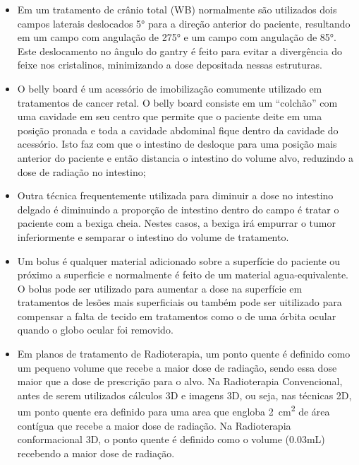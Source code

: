\documentclass[11pt,a4paper]{article}
\newcounter{exemplo}
\begin{document}
\begin{exemplo}
    \begin{itemize}
        \item Em um tratamento de crânio total (WB) normalmente são utilizados dois campos laterais deslocados \ang{5} para a direção anterior do paciente, resultando em um campo com angulação de \ang{275} e um campo com angulação de \ang{85}. Este deslocamento no ângulo do gantry é feito para evitar a divergência do feixe nos cristalinos, minimizando a dose depositada nessas estruturas. 
        
        \item O belly board é um acessório de imobilização comumente utilizado em tratamentos de cancer retal. O belly board consiste em um ``colchão'' com uma cavidade em seu centro que permite que o paciente deite em uma posição pronada e toda a cavidade abdominal fique dentro da cavidade do acessório. Isto faz com que o intestino de desloque para uma posição mais anterior do paciente e então distancia o intestino do volume alvo, reduzindo a dose de radiação no intestino; 
        
        \item Outra técnica frequentemente utilizada para diminuir a dose no intestino delgado é diminuindo a proporção de intestino dentro do campo é tratar o paciente com a bexiga cheia. Nestes casos, a bexiga irá empurrar o tumor inferiormente e semparar o intestino do volume de tratamento.
        
        \item Um bolus é qualquer material adicionado sobre a superfície do paciente ou próximo a superficie e normalmente é feito de um material agua-equivalente. O bolus pode ser utilizado para aumentar a dose na superfície em tratamentos de lesões mais superficiais ou também pode ser uitilizado para compensar a falta de tecido em tratamentos como o de uma órbita ocular quando o globo ocular foi removido.
        
        \item Em planos de tratamento de Radioterapia, um ponto quente é definido como um pequeno volume que recebe a maior dose de radiação, sendo essa dose maior que a dose de prescrição para o alvo. Na Radioterapia Convencional, antes de serem utilizados cálculos 3D e imagens 3D, ou seja, nas técnicas 2D, um ponto quente era definido para uma area que engloba \qty{2}{cm^2} de área contígua que recebe a maior dose de radiação. Na Radioterapia conformacional 3D, o ponto quente é definido como o volume (0.03mL) recebendo a maior dose de radiação.
        

\end{itemize}
\end{exemplo}
\end{document}

